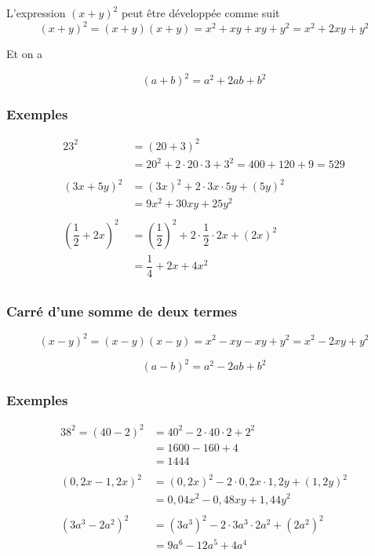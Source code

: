 \documentclass[
  12pt,
]{book}
\begin{document}
L'expression \((x+y)^2\) peut être développée comme suit \[(x+y)^2=(x+y)(x+y)=x^2+xy+xy+y^2= x^2+2xy+y^2\]

Et on a

\begin{reglebox}
\[(a+b)^2 = a^2 + 2ab + b^2\]

\end{reglebox}

\hypertarget{exemples-14}{%
\subsubsection*{Exemples}\label{exemples-14}}

\begin{align*}
23^2 &=(20+3)^2\\
    &=20^2+2\cdot 20\cdot 3+3^2 = 400+120+9=529\\
    \\
(3x+5y)^2 &= (3x)^2+2\cdot 3x \cdot 5y + (5y)^2\\
&= 9x^2+30xy+25y^2\\
\\
(\dfrac{1}{2}+2x)^2 &= (\dfrac{1}{2})^2+2\cdot\dfrac{1}{2}\cdot 2x+(2x)^2\\
&=\dfrac{1}{4}+2x+4x^2\\
\end{align*}

\hypertarget{carruxe9-dune-somme-de-deux-termes-1}{%
\subsubsection*{Carré d'une somme de deux termes}\label{carruxe9-dune-somme-de-deux-termes-1}}

\[(x-y)^2=(x-y)(x-y)=x^2-xy-xy+y^2=x^2-2xy+y^2\]

\begin{reglebox}
\[(a-b)^2 = a^2 - 2ab + b^2\]

\end{reglebox}

\hypertarget{exemples-15}{%
\subsubsection*{Exemples}\label{exemples-15}}

\begin{align*}
38^2=(40-2)^2 & = 40^2-2\cdot 40\cdot 2+2^2\\
&= 1600-160+4\\
&= 1444\\
\\
(0{,}2x-1{,}2x)^2 &= (0{,}2x)^2-2\cdot 0{,}2x\cdot 1{,}2y+(1{,}2y)^2\\
&= 0{,}04x^2 - 0{,}48xy + 1{,}44y^2\\
\\
(3a^3-2a^2)^2 &= (3a^3)^2-2\cdot 3a^3\cdot 2a^2+(2a^2)^2\\
&= 9a^6 - 12a^5 + 4a^4\\
\end{align*}
\end{document}
